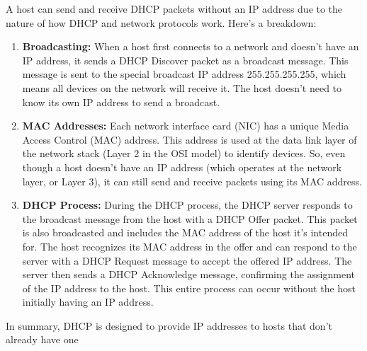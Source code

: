 A host can send and receive DHCP packets without an IP address due to the nature of how DHCP and network protocols work. Here's a breakdown:

\begin{enumerate}
  \item \textbf{Broadcasting:} When a host first connects to a network and doesn't have an IP address, it sends a DHCP Discover packet as a broadcast message. This message is sent to the special broadcast IP address 255.255.255.255, which means all devices on the network will receive it. The host doesn't need to know its own IP address to send a broadcast.

  \item \textbf{MAC Addresses:} Each network interface card (NIC) has a unique Media Access Control (MAC) address. This address is used at the data link layer of the network stack (Layer 2 in the OSI model) to identify devices. So, even though a host doesn't have an IP address (which operates at the network layer, or Layer 3), it can still send and receive packets using its MAC address.

  \item \textbf{DHCP Process:} During the DHCP process, the DHCP server responds to the broadcast message from the host with a DHCP Offer packet. This packet is also broadcasted and includes the MAC address of the host it's intended for. The host recognizes its MAC address in the offer and can respond to the server with a DHCP Request message to accept the offered IP address. The server then sends a DHCP Acknowledge message, confirming the assignment of the IP address to the host. This entire process can occur without the host initially having an IP address.
\end{enumerate}

In summary, DHCP is designed to provide IP addresses to hosts that don't already have one